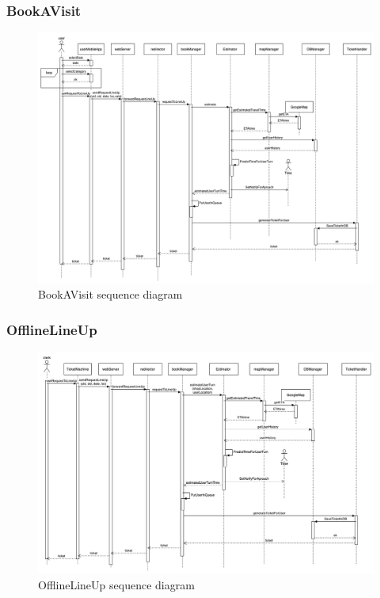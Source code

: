 \subsubsection{BookAVisit}
\begin{figure}[H]
  \centering
  \includegraphics[width=0.9\textheight, angle=90, keepaspectratio]{images/sequences/BookAVisit.png}
  \caption{BookAVisit sequence diagram}
\end{figure}
\vspace{2cm}

\subsubsection{OfflineLineUp}
\begin{figure}[H]
  \centering
  \includegraphics[width=0.9\textheight, angle=90, keepaspectratio]{images/sequences/OfflineLineUp.png}
  \caption{OfflineLineUp sequence diagram}
\end{figure}
\vspace{2cm}

